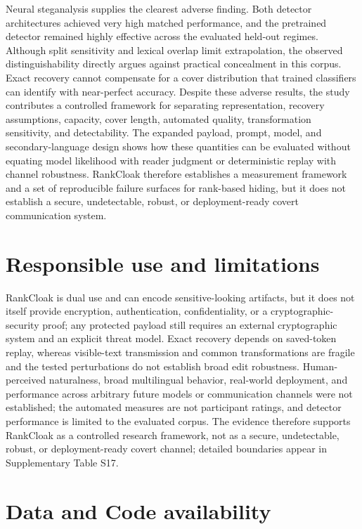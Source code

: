\documentclass[fleqn,10pt]{wlscirep}
\begin{document}
Neural steganalysis supplies the clearest adverse finding. Both detector architectures achieved very high matched performance, and the pretrained detector remained highly effective across the evaluated held-out regimes. Although split sensitivity and lexical overlap limit extrapolation, the observed distinguishability directly argues against practical concealment in this corpus. Exact recovery cannot compensate for a cover distribution that trained classifiers can identify with near-perfect accuracy.
Despite these adverse results, the study contributes a controlled framework for separating representation, recovery assumptions, capacity, cover length, automated quality, transformation sensitivity, and detectability. The expanded payload, prompt, model, and secondary-language design shows how these quantities can be evaluated without equating model likelihood with reader judgment or deterministic replay with channel robustness. RankCloak therefore establishes a measurement framework and a set of reproducible failure surfaces for rank-based hiding, but it does not establish a secure, undetectable, robust, or deployment-ready covert communication system.






\section*{Responsible use and limitations}\label{sec:limitations}

RankCloak is dual use and can encode sensitive-looking artifacts, but it does not itself provide encryption, authentication, confidentiality, or a cryptographic-security proof; any protected payload still requires an external cryptographic system and an explicit threat model. Exact recovery depends on saved-token replay, whereas visible-text transmission and common transformations are fragile and the tested perturbations do not establish broad edit robustness. Human-perceived naturalness, broad multilingual behavior, real-world deployment, and performance across arbitrary future models or communication channels were not established; the automated measures are not participant ratings, and detector performance is limited to the evaluated corpus. The evidence therefore supports RankCloak as a controlled research framework, not as a secure, undetectable, robust, or deployment-ready covert channel; detailed boundaries appear in Supplementary Table S17.


\section*{Data and Code availability}\label{sec:data-code}
\end{document}
